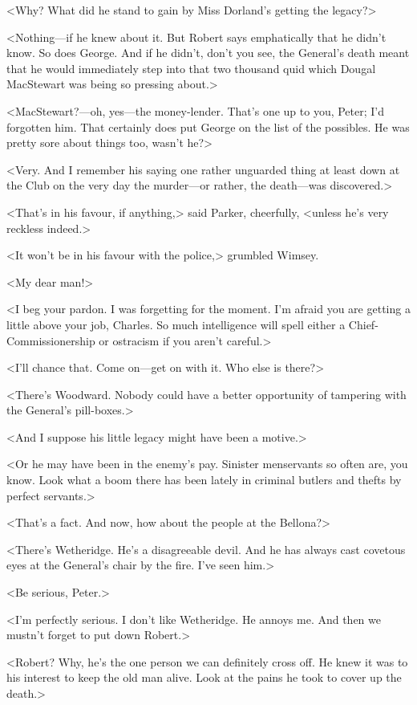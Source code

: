 <Why? What did he stand to gain by Miss Dorland's getting the legacy?>

<Nothing—if he knew about it. But Robert says emphatically that he didn't know. So does George. And if he didn't, don't you see, the General's death meant that he would immediately step into that two thousand quid which Dougal MacStewart was being so pressing about.>

<MacStewart?—oh, yes—the money-lender. That's one up to you, Peter; I'd forgotten him. That certainly does put George on the list of the possibles. He was pretty sore about things too, wasn't he?>

<Very. And I remember his saying one rather unguarded thing at least down at the Club on the very day the murder—or rather, the death—was discovered.>

<That's in his favour, if anything,> said Parker, cheerfully, <unless he's very reckless indeed.>

<It won't be in his favour with the police,> grumbled Wimsey.

<My dear man!>

<I beg your pardon. I was forgetting for the moment. I'm afraid you are getting a little above your job, Charles. So much intelligence will spell either a Chief-Commissionership or ostracism if you aren't careful.>

<I'll chance that. Come on—get on with it. Who else is there?>

<There's Woodward. Nobody could have a better opportunity of tampering with the General's pill-boxes.>

<And I suppose his little legacy might have been a motive.>

<Or he may have been in the enemy's pay. Sinister menservants so often are, you know. Look what a boom there has been lately in criminal butlers and thefts by perfect servants.>

<That's a fact. And now, how about the people at the Bellona?>

<There's Wetheridge. He's a disagreeable devil. And he has always cast covetous eyes at the General's chair by the fire. I've seen him.>

<Be serious, Peter.>

<I'm perfectly serious. I don't like Wetheridge. He annoys me. And then we mustn't forget to put down Robert.>

<Robert? Why, he's the one person we can definitely cross off. He knew it was to his interest to keep the old man alive. Look at the pains he took to cover up the death.>


